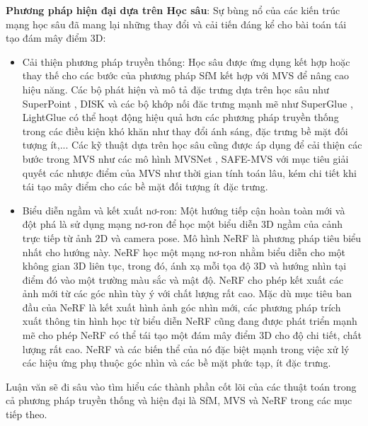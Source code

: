 \textbf{Phương pháp hiện đại dựa trên Học sâu}: Sự bùng nổ của các kiến trúc mạng học sâu đã mang lại những thay đổi và cải tiến đáng kể cho bài toán tái tạo đám mây điểm 3D:
\begin{itemize}
    \item Cải thiện phương pháp truyền thống: Học sâu được ứng dụng kết hợp hoặc thay thế cho các bước của phương pháp SfM kết hợp với MVS để nâng cao hiệu năng. Các bộ phát hiện và mô tả đặc trưng dựa trên học sâu như SuperPoint \cite{detone2018superpoint}, DISK \cite{tyszkiewicz2020disk} và các bộ khớp nối đăc trưng mạnh mẽ như SuperGlue \cite{sarlin2020superglue}, LightGlue \cite{lindenberger2023LightGlue} có thể hoạt động hiệu quả hơn các phương pháp truyền thống trong các điều kiện khó khăn như thay đổi ánh sáng, đặc trưng bề mặt đối tượng ít,... Các kỹ thuật dựa trên học sâu cũng được áp dụng để cải thiện các bước trong MVS như các mô hình MVSNet \cite{Yao2018mvsnet}, SAFE-MVS \cite{wei2023safemvs} với mục tiêu giải quyết các nhược điểm của MVS như thời gian tính toán lâu, kém chi tiết khi tái tạo mây điểm cho các bề mặt đối tượng ít đặc trưng.
    \item Biểu diễn ngầm và kết xuất nơ-ron: Một hướng tiếp cận hoàn toàn mới và đột phá là sử dụng mạng nơ-ron để học một biểu diễn 3D ngầm của cảnh trực tiếp từ ảnh 2D và camera pose. Mô hình NeRF \cite{Mildenhall2020NeRF} là phương pháp tiêu biểu nhất cho hướng này. NeRF học một mạng nơ-ron nhằm biểu diễn cho một không gian 3D liên tục, trong đó, ánh xạ mỗi tọa độ 3D và hướng nhìn tại điểm đó vào một trường màu sắc và mật độ. NeRF cho phép kết xuất các ảnh mới từ các góc nhìn tùy ý với chất lượng rất cao. Mặc dù mục tiêu ban đầu của NeRF là kết xuất hình ảnh góc nhìn mới, các phương pháp trích xuất thông tin hình học từ biểu diễn NeRF cũng đang được phát triển mạnh mẽ cho phép NeRF có thể tái tạo một đám mây điểm 3D cho độ chi tiết, chất lượng rất cao. NeRF và các biến thể của nó đặc biệt mạnh trong việc xử lý các hiệu ứng phụ thuộc góc nhìn và các bề mặt phức tạp, ít đặc trưng.
\end{itemize}

Luận văn sẽ đi sâu vào tìm hiểu các thành phần cốt lõi của các thuật toán trong cả phương pháp truyền thống và hiện đại là SfM, MVS và NeRF trong các mục tiếp theo.